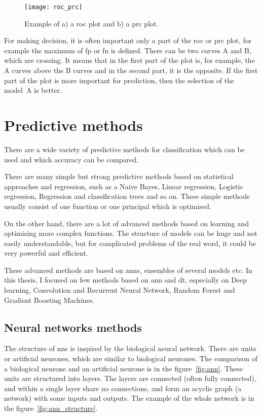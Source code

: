 \documentclass[thesis=M,english]{FITthesis}[2012/10/20]
\begin{document}
\begin{figure}[ht]\centering
    \texttt{[image: roc\_prc]}
    \caption{Example of a) a \gls{roc} plot and b) a \gls{prc} plot.}\label{fig:roc_prc}
\end{figure}


For making decision, it is often important only a part of the \gls{roc} or \gls{prc} plot, for example the maximum of \gls{fp} or \gls{fn} is defined. There can be two curves A and B, which are crossing. It means that in the first part of the plot is, for example, the A curves above the B curves and in the second part, it is the opposite. If the first part of the plot is more important for prediction, then the selection of the model~A is better.


\section{Predictive methods}

There are a wide variety of predictive methods for classification which can be used and which accuracy can be compared. 

There are many simple but strong predictive methods based on statistical approaches and regression, such as a Naive Bayes, Linear regression, Logistic regression, Regression and classification trees and so on. These simple methods usually consist of one function or one principal which is optimised. 

On the other hand, there are a lot of advanced methods based on learning and optimising more complex functions. The structure of models can be huge and not easily understandable, but for complicated problems of the real word, it could be very powerful and efficient. 

These advanced methods are based on \gls{ann}s, ensembles of several models etc. In this thesis, I focused on few methods based on \gls{ann} and \gls{dt}, especially on Deep learning, Convolution and Recurrent Neural Network, Random Forest and Gradient Boosting Machines. 

\subsection{Neural networks methods}

The structure of \gls{nn}s is inspired by the biological neural network. There are units or artificial neurones, which are similar to biological neurones. The comparison of a biological neurone and an artificial neurone is in the figure~\ref{fig:ann}\cite{Johnson2017ann_intro}. These units are structured into layers. The layers are connected (often fully connected), and within a single layer share no connections, and form an acyclic graph (a network) with some inputs and outputs. The example of the whole network is in the figure~\ref{fig:ann_structure}.
\end{document}
